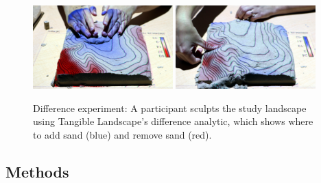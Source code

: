 \documentclass[prodmode,acmtochi]{acmsmall} %
\begin{document}
\begin{figure}
\begin{center}
	\includegraphics[width=0.48\textwidth]{images/experiments/difference_1.jpg}
	\includegraphics[width=0.48\textwidth]{images/experiments/difference_2.jpg}
	\caption{Difference experiment: 
	A participant sculpts the study landscape using Tangible Landscape's difference
	analytic, which shows where to add sand (blue) and remove sand (red).}
	\label{fig:diff}
\end{center}
\end{figure}

\subsection{Methods}

% 
%

\end{document}
